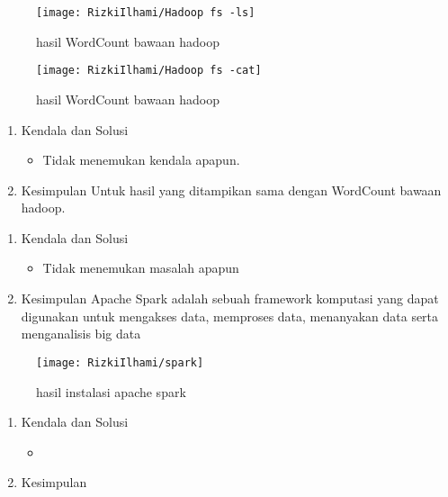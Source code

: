 \begin{figure}[!ht]
    \texttt{[image: RizkiIlhami/Hadoop fs -ls]}
    \caption{hasil WordCount bawaan hadoop}
    \label{gam:Hasil}
\end{figure}

\begin{figure}[!ht]
    \texttt{[image: RizkiIlhami/Hadoop fs -cat]}
    \caption{hasil WordCount bawaan hadoop}
    \label{gam:Hasil}
\end{figure}

\begin{enumerate}
\item Kendala dan Solusi

\begin{itemize}
\item Tidak menemukan kendala apapun.
\end{itemize}

\item Kesimpulan
\newline
    Untuk hasil yang ditampikan sama dengan WordCount bawaan hadoop.

\end{enumerate}

\begin{enumerate}
\item Kendala dan Solusi

\begin{itemize}
\item Tidak menemukan masalah apapun
\end{itemize}


\item Kesimpulan
\newline
    Apache Spark adalah sebuah framework komputasi
    yang dapat digunakan untuk mengakses data, memproses
    data, menanyakan data serta menganalisis big data

\end{enumerate}

\begin{figure}[!ht]
\texttt{[image: RizkiIlhami/spark]}
\caption{hasil instalasi apache spark }
\label{gam:hasil instalasi spark}
\end{figure}

\begin{enumerate}
\item Kendala dan Solusi

\begin{itemize}
\item 
\end{itemize}


\item Kesimpulan

\end{enumerate}


